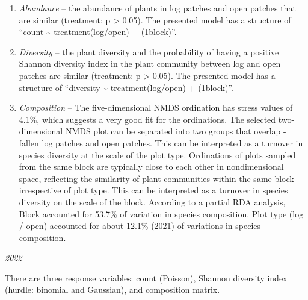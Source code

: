\documentclass[
]{article}
\providecommand{\tightlist}{%
  \setlength{\itemsep}{0pt}\setlength{\parskip}{0pt}}
\begin{document}
\begin{enumerate}
\def\labelenumi{\arabic{enumi}.}
\tightlist
\item
  \emph{Abundance} -- the abundance of plants in log patches and open
  patches that are similar (treatment: p \textgreater{} 0.05). The
  presented model has a structure of ``count \textasciitilde{}
  treatment(log/open) + (1\textbar block)''.
\item
  \emph{Diversity} -- the plant diversity and the probability of having
  a positive Shannon diversity index in the plant community between log
  and open patches are similar (treatment: p \textgreater{} 0.05). The
  presented model has a structure of ``diversity \textasciitilde{}
  treatment(log/open) + (1\textbar block)''.
\item
  \emph{Composition} -- The five-dimensional NMDS ordination has stress
  values of 4.1\%, which suggests a very good fit for the ordinations.
  The selected two-dimensional NMDS plot can be separated into two
  groups that overlap - fallen log patches and open patches. This can be
  interpreted as a turnover in species diversity at the scale of the
  plot type. Ordinations of plots sampled from the same block are
  typically close to each other in nondimensional space, reflecting the
  similarity of plant communities within the same block irrespective of
  plot type. This can be interpreted as a turnover in species diversity
  on the scale of the block. According to a partial RDA analysis, Block
  accounted for 53.7\% of variation in species composition. Plot type
  (log / open) accounted for about 12.1\% (2021) of variations in
  species composition.
\end{enumerate}

\emph{2022}

There are three response variables: count (Poisson), Shannon diversity
index (hurdle: binomial and Gaussian), and composition matrix.
\end{document}
